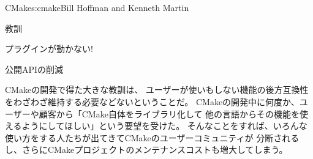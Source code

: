 \begin{aosachapter}{CMake}{s:cmake}{Bill Hoffman and Kenneth Martin}
\begin{aosasect1}{教訓}
\begin{aosasect2}{プラグインが動かない!}
\end{aosasect2}

\begin{aosasect2}{公開APIの削減}

CMakeの開発で得た大きな教訓は、
ユーザーが使いもしない機能の後方互換性をわざわざ維持する必要などないということだ。
CMakeの開発中に何度か、ユーザーや顧客から「CMake自体をライブラリ化して
他の言語からその機能を使えるようにしてほしい」という要望を受けた。
そんなことをすれば、いろんな使い方をする人たちが出てきてCMakeのユーザーコミュニティが
分断されるし、さらにCMakeプロジェクトのメンテナンスコストも増大してしまう。

\end{aosasect2}

\end{aosasect1}

\end{aosachapter}

